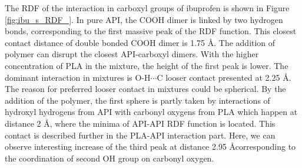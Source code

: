 The RDF of the interaction in carboxyl groups of ibuprofen is shown in Figure \ref{fig:ibu_s_RDF_}. In pure API, the COOH dimer is linked by two hydrogen bonds, corresponding to the first massive peak of the RDF function. This closest contact distance of double bonded COOH dimer is 1.75 \AA. The addition of polymer can disrupt the closest API-carboxyl dimers. With the higher concentration of PLA in the mixture, the height of the first peak is lower. The dominant interaction in mixtures is O-H$\cdots$C looser contact presented at 2.25 \AA. The reason for preferred looser contact in mixtures could be spherical. By the addition of the polymer, the first sphere is partly taken by interactions of hydroxyl hydrogens from API with carbonyl oxygens from PLA which happen at distance 2 \AA, where the minima of API-API RDF function is located. This contact is described further in the PLA-API interaction part. Here, we can observe interesting increase of the third peak at distance 2.95 \AA corresponding to the coordination of second OH group on carbonyl oxygen.

